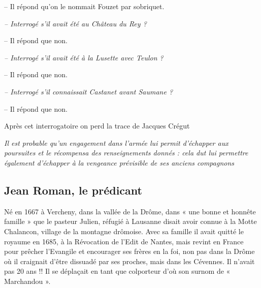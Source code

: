 \hspace{10mm}-- Il répond qu’on le nommait Fouzet par sobriquet.

\vspace{0.2em}

\hspace{5mm}\textit{-- Interrogé s’il avait été au Château du Rey ?}

\hspace{10mm}-- Il répond que non.

\vspace{0.2em}

\hspace{5mm}\textit{-- Interrogé s’il avait été à la Lusette avec Teulon ?}

\hspace{10mm}-- Il répond que non.

\vspace{0.2em}

\hspace{5mm}\textit{-- Interrogé s’il connaissait Castanet avant Saumane ?}

\hspace{10mm}-- Il répond que non.

\vspace{0.6em}

\begin{tcolorbox}[
  colback=white,
  colframe=black,
  boxrule=0.7pt,
  arc=0pt,
  left=0.25cm,
  right=0.25cm,
  top=0.12cm,
  bottom=0.12cm,
  boxsep=0pt
]
Après cet interrogatoire on perd la trace de Jacques Crégut

\vspace{0.35em}

\textit{Il est probable qu’un engagement dans l’armée lui permit d’échapper aux poursuites et le récompensa des renseignements donnés : cela dut lui permettre également d’échapper à la vengeance prévisible de ses anciens compagnons}
\end{tcolorbox}

\subsection{Jean Roman, le prédicant}

\vspace{0.35em}

Né en 1667 à Vercheny, dans la vallée de la Drôme, dans « une bonne et honnête famille » que le pasteur Julien, réfugié à Lausanne disait avoir connue à la Motte Chalancon, village de la montagne drômoise. Avec sa famille il avait quitté le royaume en 1685, à la Révocation de l’Edit de Nantes, mais revint en France pour prêcher l’Evangile et encourager ses frères en la foi, non pas dans la Drôme où il craignait d’être dissuadé par ses proches, mais dans les Cévennes. Il n’avait pas 20 ans !! Il se déplaçait en tant que colporteur d’où son surnom de « Marchandou ».

